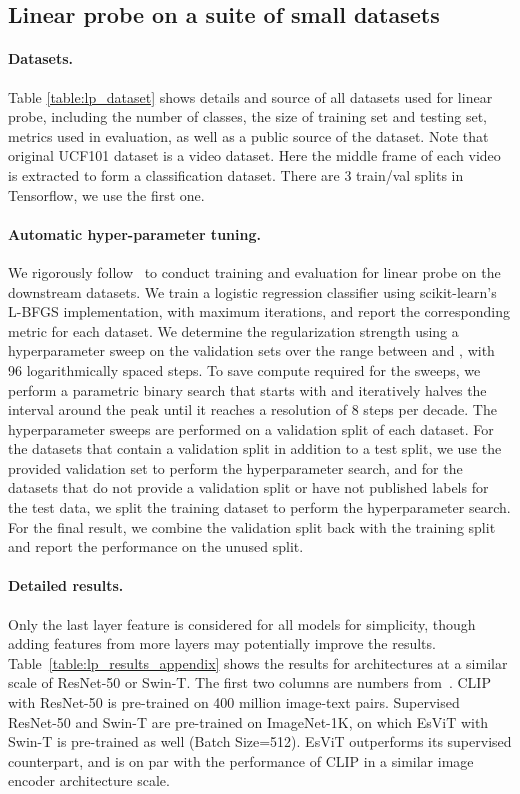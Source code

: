 \documentclass{article} \usepackage{iclr2022_conference,times}
\newcommand{\shortname}{EsViT}
\begin{document}
\subsection{Linear probe on a suite of small datasets}
\paragraph{Datasets.} Table \ref{table:lp_dataset} shows details and source of all datasets used for linear probe, including the number of classes, the size of training set and testing set, metrics used in evaluation, as well as a public source of the dataset.
Note that original  UCF101 dataset is a video dataset. Here the middle frame of each video is extracted to form a classification dataset. There are 3 train/val splits in Tensorflow, we use the first one.

\paragraph{Automatic hyper-parameter tuning.} We rigorously follow~\citep{radford2021learning} to conduct training and evaluation for linear probe on the downstream datasets. 
We train a logistic regression classifier using scikit-learn's L-BFGS implementation, with maximum  iterations, and report the corresponding metric for each dataset. We determine the  regularization strength  using a hyperparameter sweep on the validation
sets over the range between  and  , with 96 logarithmically spaced steps. To save compute required for the sweeps, we perform a parametric binary search that starts with 
 and iteratively halves the interval around the peak until it reaches a resolution of 8 steps per decade. The hyperparameter sweeps are performed on a validation split of each dataset. For the datasets that contain a validation split in addition to a test split, we use the provided validation set to perform the hyperparameter search, and for the datasets that do not provide a validation split or have not published labels for
the test data, we split the training dataset to perform the hyperparameter search. For the final result, we combine the validation split back with the training split and report the performance on the unused split.

\paragraph{Detailed results.} 
Only the last layer feature is considered for all models for simplicity, though adding features from more layers may potentially improve the results. Table~\ref{table:lp_results_appendix} shows the results for architectures at a similar scale of ResNet-50 or Swin-T. 
The first two columns are numbers from~\citep{radford2021learning}.
CLIP with ResNet-50 is pre-trained on  400 million image-text pairs. Supervised ResNet-50 and Swin-T are pre-trained on ImageNet-1K, on which \shortname{} with Swin-T is pre-trained as well (Batch Size=512). \shortname{} outperforms its supervised counterpart, and is on par with the performance of CLIP in a similar image encoder architecture scale.
\end{document}
